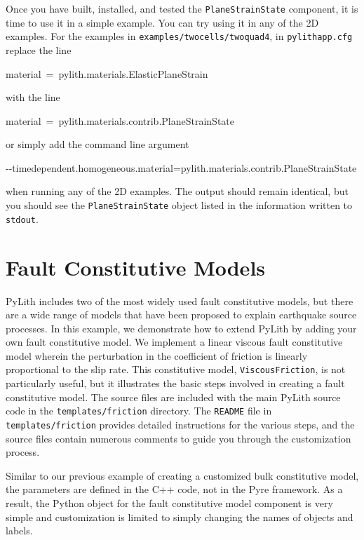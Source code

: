 Once you have built, installed, and tested the \texttt{PlaneStrainState}
component, it is time to use it in a simple example. You can try using
it in any of the 2D examples. For the examples in \texttt{examples/twocells/twoquad4},
in \texttt{pylithapp.cfg} replace the line
\begin{lyxcode}
material~=~pylith.materials.ElasticPlaneStrain
\end{lyxcode}
with the line
\begin{lyxcode}
material~=~pylith.materials.contrib.PlaneStrainState
\end{lyxcode}
or simply add the command line argument
\begin{lyxcode}
-{}-timedependent.homogeneous.material=pylith.materials.contrib.PlaneStrainState
\end{lyxcode}
when running any of the 2D examples. The output should remain identical,
but you should see the \texttt{PlaneStrainState} object listed in
the information written to \texttt{stdout}.


\section{\label{sec:Extending:FaultConstitutiveModels}Fault Constitutive
Models}

PyLith includes two of the most widely used fault constitutive models,
but there are a wide range of models that have been proposed to explain
earthquake source processes. In this example, we demonstrate how to
extend PyLith by adding your own fault constitutive model. We implement
a linear viscous fault constitutive model wherein the perturbation
in the coefficient of friction is linearly proportional to the slip
rate. This constitutive model, \texttt{ViscousFriction}, is not particularly
useful, but it illustrates the basic steps involved in creating a
fault constitutive model. The source files are included with the main
PyLith source code in the \texttt{templates/friction} directory. The
\texttt{README} file in \texttt{templates/friction} provides detailed
instructions for the various steps, and the source files contain numerous
comments to guide you through the customization process.

Similar to our previous example of creating a customized bulk constitutive
model, the parameters are defined in the C++ code, not in the Pyre
framework. As a result, the Python object for the fault constitutive
model component is very simple and customization is limited to simply
changing the names of objects and labels.

